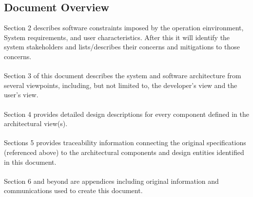 \documentclass[letterpaper]{article}
\begin{document}
\subsection{\bfseries{Document Overview}}
Section 2 describes software constraints imposed by the operation einvironment, System requirements, and user characteristics. After this it will identify the system stakeholders and lists/describes their concerns and mitigations to those concerns. \\
\\
Section 3 of this document describes the system and software
architecture from several viewpoints, including, but not limited to,
the developer{\textquoteright}s view and the user{\textquoteright}s
view.\\
\\
Section 4 provides detailed design descriptions for every component
defined in the architectural view(s). \\
\\
Sections 5 provides traceability information connecting the original specifications
(referenced above) to the architectural components and design entities identified in this document.\\
\\
Section 6 and beyond are appendices including original information and communications used to create this document.
\end{document}
